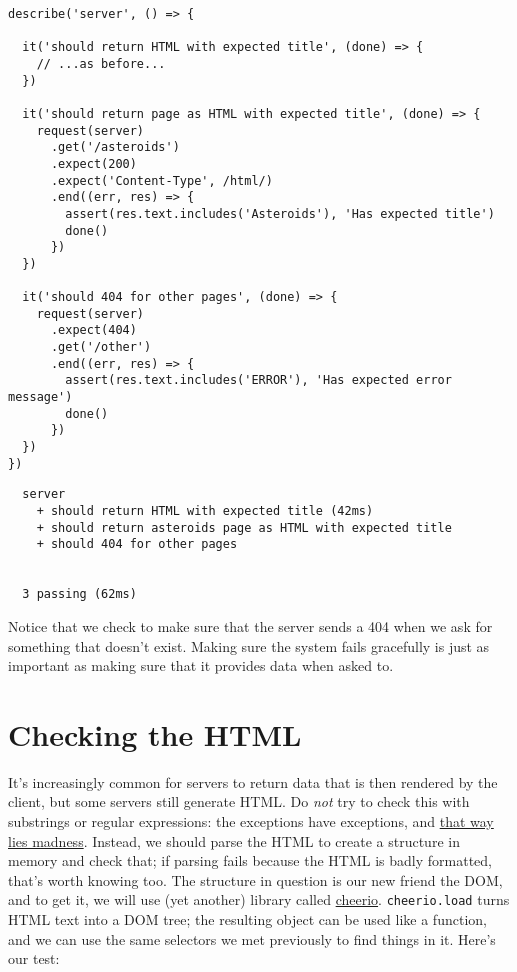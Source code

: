 \begin{verbatim}
describe('server', () => {

  it('should return HTML with expected title', (done) => {
    // ...as before...
  })

  it('should return page as HTML with expected title', (done) => {
    request(server)
      .get('/asteroids')
      .expect(200)
      .expect('Content-Type', /html/)
      .end((err, res) => {
        assert(res.text.includes('Asteroids'), 'Has expected title')
        done()
      })
  })

  it('should 404 for other pages', (done) => {
    request(server)
      .expect(404)
      .get('/other')
      .end((err, res) => {
        assert(res.text.includes('ERROR'), 'Has expected error message')
        done()
      })
  })
})
\end{verbatim}

\begin{verbatim}
  server
    + should return HTML with expected title (42ms)
    + should return asteroids page as HTML with expected title
    + should 404 for other pages


  3 passing (62ms)
\end{verbatim}

Notice that we check to make sure that the server sends a 404
when we ask for something that doesn't exist.
Making sure the system fails gracefully is just as important
as making sure that it provides data when asked to.

\section{Checking the HTML}\label{s:testing-html}

It's increasingly common for servers to return data that is then rendered by the client,
but some servers still generate HTML.
Do \emph{not} try to check this with substrings or regular expressions:
the exceptions have exceptions,
and \href{https://stackoverflow.com/a/1732454}{that way lies madness}.
Instead,
we should parse the HTML to create a structure in memory and check that;
if parsing fails because the HTML is badly formatted, that's worth knowing too.
The structure in question is our new friend the DOM,
and to get it,
we will use (yet another) library called \href{https://cheerio.js.org/}{cheerio}.
\texttt{cheerio.load} turns HTML text into a DOM tree;
the resulting object can be used like a function,
and we can use the same selectors we met previously to find things in it.
Here's our test:

